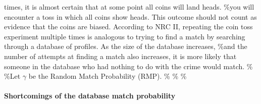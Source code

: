 \documentclass[10pt,dvipsnames,enabledeprecatedfontcommands]{scrartcl}
\let\oldparagraph\paragraph
\renewcommand{\paragraph}[1]{\oldparagraph{#1}\mbox{}}
\begin{document}
times, it is almost certain that at some point all coins will land
heads. \%you will encounter a toss in which all coins show heads. This
outcome should not count as evidence that the coins are biased.
According to NRC II, repeating the coin toss experiment multiple times
is analogous to trying to find a match by searching through a database
of profiles. As the size of the database increases, \%and the number of
attempts at finding a match also increases, it is more likely that
someone in the database who had nothing to do with the crime would
match. \% \%Let \(\gamma\) be the Random Match Probability (RMP). \% \%
\%\paragraph{Shortcomings of the database match probability}
\end{document}
